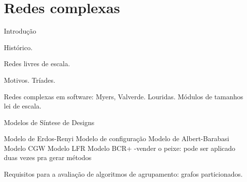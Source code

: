 
\chapter{Redes complexas}

\begin{section}{Introdução}

Histórico.

Redes livres de escala.

Motivos. Tríades.

Redes complexas em software:
 Myers, Valverde.
 Louridas. Módulos de tamanhos lei de escala.

\end{section}
\begin{section}{Modelos de Síntese de Designs}

Modelo de Erdos-Renyi
Modelo de configuração
Modelo de Albert-Barabasi
Modelo CGW
Modelo LFR
Modelo BCR+ -vender o peixe: pode ser aplicado duas vezes pra gerar métodos

Requisitos para a avaliação de algoritmos de agrupamento: grafos particionados.

\end{section}
